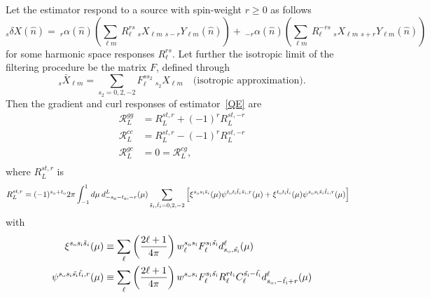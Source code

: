 \documentclass{article}
\newcommand{\si}[0]{{s_{\rm i}}}
\newcommand{\ti}[0]{{t_{\rm i}}}
\newcommand{\so}[0]{{s_{\rm o}}}
\renewcommand{\to}[0]{{t_{\rm o}}}
\newcommand{\Ylm}[1]{\:_{#1}Y_{\ell m}}
\newcommand{\resp}{ {\mathcal R} }
\newcommand{\hn}[0]{\hat n}
\begin{document}
	
Let the estimator respond to a source with spin-weight $r \ge 0$ as follows
\begin{equation}
	_{s}\delta X(\hn) = \:_{r}\alpha(\hn) \left( \sum_{\ell m}\: R_\ell^{r s} \:_sX_{\ell m} \Ylm {s- r}(\hn)\right) + \:_{-r}\alpha(\hn) \left( \sum_{\ell m}\: R_\ell^{-r s} \:_sX_{\ell m} \Ylm {s + r}(\hn) \right)
\end{equation}
for some harmonic space responses $R_\ell^{rs}$. Let further the isotropic limit of the filtering procedure be the matrix $F$, defined through
\begin{equation}
	_{s}\bar X_{\ell m} = \sum_{s_2 = 0,2,-2}F_\ell^{s s_2} \:_{s_2}X_{\ell m} \quad \textrm{(isotropic approximation)}.
\end{equation} Then the gradient and curl responses of estimator~\eqref{QE} are
\begin{equation}\boxed{
	\begin{split}
		\resp^{gg}_L &= R_L^{st, r} + (-1)^r R_L^{st, -r}\\
		\resp^{cc}_L &= R_L^{st, r} - (-1)^r R_L^{st, -r} \\
		\resp^{gc}_L &= 0 = \resp^{cg}_L, \\
	\end{split}}
\end{equation}
where $R_L^{st, r}$ is
\begin{equation}
\begin{split}
R_L^{st, r} &= (-1)^{\so + \to}2\pi  \int_{-1}^1 d \mu\: d^L_{-\so - \to, -r}(\mu)\sum_{\tilde s_i,\tilde t_i = 0,2,-2}  \left[\xi^{\so \si \tilde s_i} (\mu)\psi^{\to \ti \tilde t_i \tilde s_i, r }(\mu) +  \xi^{\to \ti \tilde t_i}(\mu) \psi^{\so \si \tilde s_i \tilde t_i, r }(\mu) \right]
\end{split}
\end{equation}
with
\begin{equation}
\begin{split}
\xi^{\so\si \tilde s_i}(\mu) &\equiv  \sum_\ell \left(\frac{2\ell + 1}{4\pi}\right)w^{\so\si}_\ell F_\ell^{\si \tilde \si} d^\ell_{\so,\tilde \si}(\mu) \\
\psi^{\so\si \tilde \si \tilde \ti, r}(\mu) &\equiv  \sum_\ell \left(\frac{2\ell + 1}{4\pi}\right)w^{\so \si}F^{\si \tilde \si}_\ell R^{r\ti}_\ell C_\ell^{\tilde \si- \tilde\ti} d^\ell_{\so,-\tilde \ti + r}(\mu) 
\end{split}
\end{equation}

\clearpage
\end{document}
